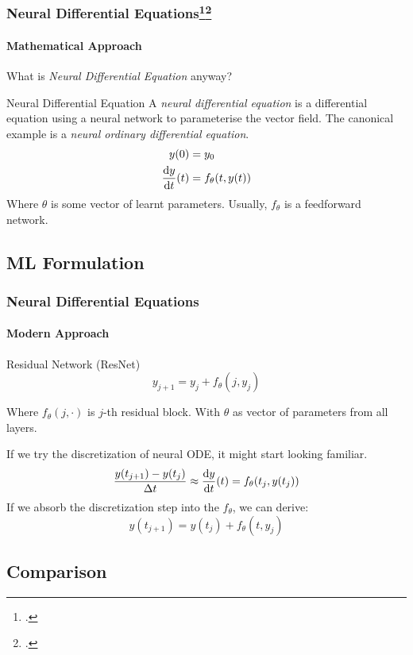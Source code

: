 \documentclass[
    11pt, %
    aspectratio=169, ]{beamer}%
\begin{document}
\begin{frame}
    \frametitle{Neural Differential Equations\footcite{chenNeuralOrdinaryDifferential2019}\footcite{kidgerNeuralDifferentialEquations2022}}
    \framesubtitle{Mathematical Approach}
    What is \textit{Neural Differential Equation} anyway?
    \begin{block}{Neural Differential Equation}
        A \textit{neural differential equation} is a differential equation using a neural
        network to parameterise the vector field. The canonical example is a \textit{neural
            ordinary differential equation}.
        \begin{align}
            y(0) & = y_0 \\ \odv{y}{t}(t) &= f_\theta(t, y(t))
        \end{align}
        Where \(\theta\) is some vector of learnt parameters. Usually, \(f_\theta\) is a feedforward network.
    \end{block}
\end{frame}

\subsection{ML Formulation}

\begin{frame}
    \frametitle{Neural Differential Equations}
    \framesubtitle{Modern Approach}
    \begin{block}{Residual Network (ResNet)}
        \begin{equation}
            y_{j+1} = y_j + f_\theta(j, y_j)
        \end{equation}

        Where \(f_\theta(j, \cdot)\) is \(j\)-th residual block. With \(\theta\) as
        vector of parameters from all layers.
    \end{block}

    If we try the discretization of neural ODE, it might start looking familiar.
    \begin{equation}
        \frac{y(t_{j + 1}) - y(t_j)}{\Delta t} \approx \odv{y}{t}(t) = f_\theta(t_j, y(t_j))
    \end{equation}
    If we absorb the discretization step into the \(f_\theta\), we can derive:
    \begin{equation}
        y(t_{j + 1}) = y(t_j) + f_\theta(t, y_j)
    \end{equation}
\end{frame}
\subsection{Comparison}
\end{document}
